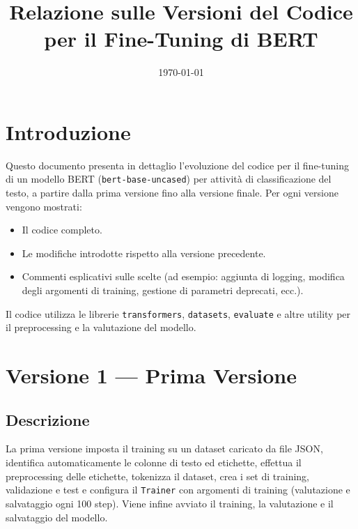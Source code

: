 \documentclass[a4paper,12pt]{article}
\title{Relazione sulle Versioni del Codice per il Fine-Tuning di BERT}
\author{ }
\date{\today}
\begin{document}
\maketitle

\section{Introduzione}
Questo documento presenta in dettaglio l'evoluzione del codice per il fine-tuning di un modello BERT (\texttt{bert-base-uncased}) per attività di classificazione del testo, a partire dalla prima versione fino alla versione finale. Per ogni versione vengono mostrati:
\begin{itemize}
    \item Il codice completo.
    \item Le modifiche introdotte rispetto alla versione precedente.
    \item Commenti esplicativi sulle scelte (ad esempio: aggiunta di logging, modifica degli argomenti di training, gestione di parametri deprecati, ecc.).
\end{itemize}

Il codice utilizza le librerie \texttt{transformers}, \texttt{datasets}, \texttt{evaluate} e altre utility per il preprocessing e la valutazione del modello.

\section{Versione 1 --- Prima Versione}
\subsection*{Descrizione}
La prima versione imposta il training su un dataset caricato da file JSON, identifica automaticamente le colonne di testo ed etichette, effettua il preprocessing delle etichette, tokenizza il dataset, crea i set di training, validazione e test e configura il \texttt{Trainer} con argomenti di training (valutazione e salvataggio ogni 100 step). Viene infine avviato il training, la valutazione e il salvataggio del modello.
\end{document}
